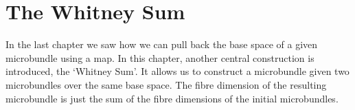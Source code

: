 \chapter{The Whitney Sum}\label{chapter::whitney}
\begin{myparagraph}
    In the last chapter we saw how we can pull back the base space of a given microbundle using a map.
    In this chapter, another central construction is introduced, the `Whitney Sum'.
    It allows us to construct a microbundle given two microbundles over the same base space.
    The fibre dimension of the resulting microbundle is just the sum of the fibre dimensions of the initial microbundles.
\end{myparagraph}


